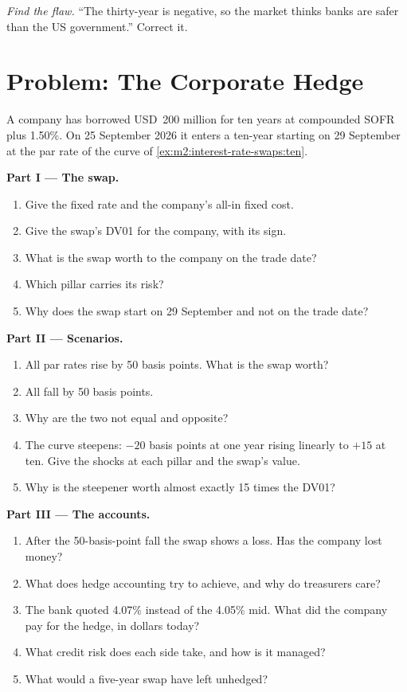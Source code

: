\begin{exercise}[$\star\star\star$]\label{exo:m2:interest-rate-swaps:8}
\emph{Find the flaw.} ``The thirty-year  is negative, so the market
thinks banks are safer than the US government.'' Correct it.
\end{exercise}

\section{Problem: The Corporate Hedge}

\begin{problem}\label{pb:m2:interest-rate-swaps:1}
A company has borrowed USD~200 million for ten years at compounded SOFR plus
1.50\%. On 25 September 2026 it enters a ten-year  starting on 29
September at the par rate of the curve of \cref{ex:m2:interest-rate-swaps:ten}.

\medskip\noindent\textbf{Part I --- The swap.}
\begin{enumerate}
\item Give the fixed rate and the company's all-in fixed cost.
\item Give the swap's DV01 for the company, with its sign.
\item What is the swap worth to the company on the trade date?
\item Which pillar carries its risk?
\item Why does the swap start on 29 September and not on the trade date?
\end{enumerate}

\medskip\noindent\textbf{Part II --- Scenarios.}
\begin{enumerate}[resume]
\item All par rates rise by 50 basis points. What is the swap worth?
\item All fall by 50 basis points.
\item Why are the two not equal and opposite?
\item The curve steepens: $-20$ basis points at one year rising linearly to $+15$
at ten. Give the shocks at each pillar and the swap's value.
\item Why is the steepener worth almost exactly 15 times the DV01?
\end{enumerate}

\medskip\noindent\textbf{Part III --- The accounts.}
\begin{enumerate}[resume]
\item After the 50-basis-point fall the swap shows a loss. Has the company lost
money?
\item What does hedge accounting try to achieve, and why do treasurers care?
\item The bank quoted 4.07\% instead of the 4.05\% mid. What did the company pay
for the hedge, in dollars today?
\item What credit risk does each side take, and how is it managed?
\item What would a five-year swap have left unhedged?
\end{enumerate}


\end{problem}
